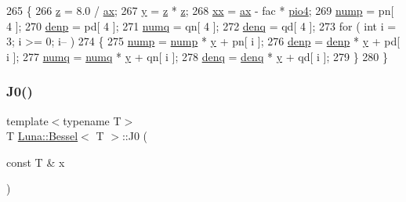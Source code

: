 \begin{DoxyCode}
265       \{
266             \hyperlink{structLuna_1_1Bessel_a3ffa857b03c181b3e3ba7422124c60e1}{z} = 8.0 / \hyperlink{structLuna_1_1Bessel_ace7f3d0a3d4fcca01955bd95cdede89a}{ax};
267             \hyperlink{structLuna_1_1Bessel_ab054d5c26284b7736633c171cd2717fc}{y} = \hyperlink{structLuna_1_1Bessel_a3ffa857b03c181b3e3ba7422124c60e1}{z} * \hyperlink{structLuna_1_1Bessel_a3ffa857b03c181b3e3ba7422124c60e1}{z};
268             \hyperlink{structLuna_1_1Bessel_a15736ca5396b6f1b87895da22654d522}{xx} = \hyperlink{structLuna_1_1Bessel_ace7f3d0a3d4fcca01955bd95cdede89a}{ax} - fac * \hyperlink{structLuna_1_1Bessel_a25963b9942422f3d48c0239e8be57f0c}{pio4};
269             \hyperlink{structLuna_1_1Bessel_a01ee09f3e4275f102df4c3b83fad1776}{nump} = pn[ 4 ];
270             \hyperlink{structLuna_1_1Bessel_a71fa71babc245cef7c0902591ed30fff}{denp} = pd[ 4 ];
271             \hyperlink{structLuna_1_1Bessel_aa126082495f16ae7d353f0b0623c80b8}{numq} = qn[ 4 ];
272             \hyperlink{structLuna_1_1Bessel_a76731982814bd931ae5e8eb725f22c85}{denq} = qd[ 4 ];
273             \textcolor{keywordflow}{for} ( \textcolor{keywordtype}{int} i = 3; i >= 0; i-- )
274         \{
275                 \hyperlink{structLuna_1_1Bessel_a01ee09f3e4275f102df4c3b83fad1776}{nump} = \hyperlink{structLuna_1_1Bessel_a01ee09f3e4275f102df4c3b83fad1776}{nump} * \hyperlink{structLuna_1_1Bessel_ab054d5c26284b7736633c171cd2717fc}{y} + pn[ i ];
276                 \hyperlink{structLuna_1_1Bessel_a71fa71babc245cef7c0902591ed30fff}{denp} = \hyperlink{structLuna_1_1Bessel_a71fa71babc245cef7c0902591ed30fff}{denp} * \hyperlink{structLuna_1_1Bessel_ab054d5c26284b7736633c171cd2717fc}{y} + pd[ i ];
277                 \hyperlink{structLuna_1_1Bessel_aa126082495f16ae7d353f0b0623c80b8}{numq} = \hyperlink{structLuna_1_1Bessel_aa126082495f16ae7d353f0b0623c80b8}{numq} * \hyperlink{structLuna_1_1Bessel_ab054d5c26284b7736633c171cd2717fc}{y} + qn[ i ];
278                 \hyperlink{structLuna_1_1Bessel_a76731982814bd931ae5e8eb725f22c85}{denq} = \hyperlink{structLuna_1_1Bessel_a76731982814bd931ae5e8eb725f22c85}{denq} * \hyperlink{structLuna_1_1Bessel_ab054d5c26284b7736633c171cd2717fc}{y} + qd[ i ];
279             \}
280         \}
\end{DoxyCode}
\mbox{\label{structLuna_1_1Bessel_a8eeb87d47905d77825276a27ff59de12}} 
\subsubsection{\texorpdfstring{J0()}{J0()}}
{\footnotesize\ttfamily template$<$typename T$>$ \\
T \hyperlink{structLuna_1_1Bessel}{Luna\+::\+Bessel}$<$ T $>$\+::J0 (\begin{DoxyParamCaption}\item[{const T \&}]{x }\end{DoxyParamCaption})\hspace{0.3cm}{\ttfamily [inline]}}



